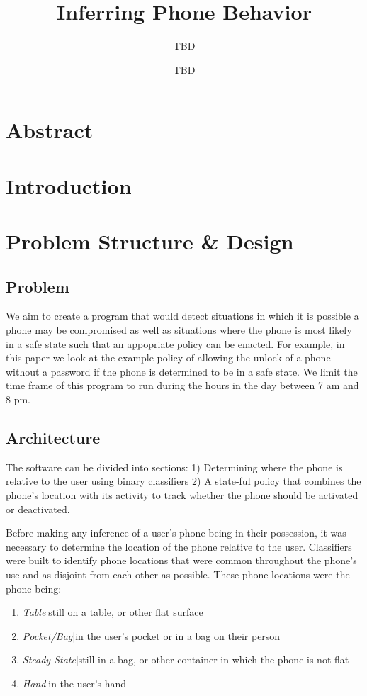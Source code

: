 \documentclass{article}
\title{Inferring Phone Behavior}
\author{TBD}
\date{TBD}
\begin{document}
\maketitle
\tableofcontents
\newpage

\section{Abstract}
\section{Introduction}

\section{Problem Structure \& Design}
\subsection{Problem}
\indent We aim to create a program that would detect situations in which it is possible a phone may be compromised as well as situations where the phone is most likely in a safe state such that an appopriate policy can be enacted. 
For example, in this paper we look at the example policy of allowing the unlock of a phone without a password if the phone is determined to be in a safe state. 
We limit the time frame of this program to run during the hours in the day between 7 am and 8 pm. 
\subsection{Architecture}
The software can be divided into sections: 1) Determining where the phone is relative to the user using binary classifiers
2) A state-ful policy that combines the phone's location with its activity to track whether the phone should be activated or deactivated.

Before making any inference of a user's phone being in their possession, it was necessary to determine the location
of the phone relative to the user.
Classifiers were built to identify phone locations that were common throughout the phone's use and as disjoint from 
each other as possible. These phone locations were the phone being:
\begin{enumerate}
\item \textit{Table}|still on a table, or other flat surface
\item \textit{Pocket/Bag}|in the user's pocket or in a bag on their person
\item \textit{Steady State}|still in a bag, or other container in which the phone is not flat
\item \textit{Hand}|in the user's hand
\end{enumerate}
\end{document}
